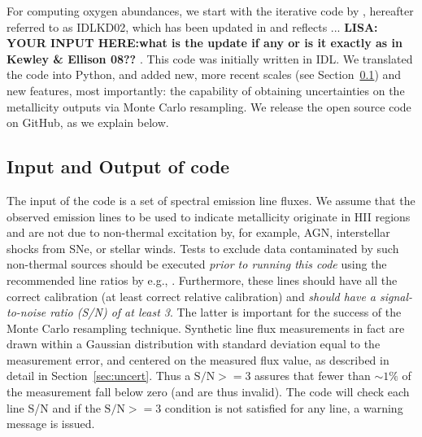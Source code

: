 \documentclass{emulateapj}
\begin{document}
\begin{figure}[!ht]
 \label{metallicity_distribution}
\end{figure}


For computing oxygen abundances, we start with the iterative code by \citet{kewley02}, hereafter referred to as IDLKD02, which has been updated in \citet{kewley08} and reflects ... \textbf{LISA: YOUR INPUT HERE:what is the update if any or is it exactly as in Kewley \& Ellison 08?? }. This code was initially written in IDL.  We translated the code into Python, and added new, more recent scales (see Section~\ref{sec:IO}) and new features, most importantly: the capability of obtaining uncertainties on the metallicity outputs via Monte Carlo resampling. We release the open source code on GitHub, as we explain below.


\subsection{Input and Output of code}\label{sec:IO}

The input of the code is a set of spectral emission line fluxes. We assume that the observed emission lines to be used to indicate metallicity originate in HII regions and are not due to non-thermal excitation by, for example, AGN, interstellar shocks from SNe, or stellar winds.  Tests to exclude data contaminated by such non-thermal sources should be executed \emph{prior to running this code} using the recommended line ratios by e.g., \citet{baldwin81,kauffmann03,kewley06_sdss}. Furthermore, these lines should have all the correct calibration (at least correct relative calibration) and \emph{should have a signal-to-noise ratio (S/N) of at least 3}. The latter is important for the success of the Monte Carlo resampling technique.
Synthetic line flux measurements in fact are drawn within a Gaussian distribution with standard deviation equal to the measurement error, and centered on the measured flux value, as described in detail in Section~\ref{sec:uncert}. Thus  a $\mathrm{S/N} >= 3$ assures that fewer than $\sim1\%$ of the measurement fall below zero (and are thus invalid).
The code will check each line S/N and if the $\mathrm{S/N} >= 3$ condition is not satisfied for any line, a warning message is issued.
\end{document}
